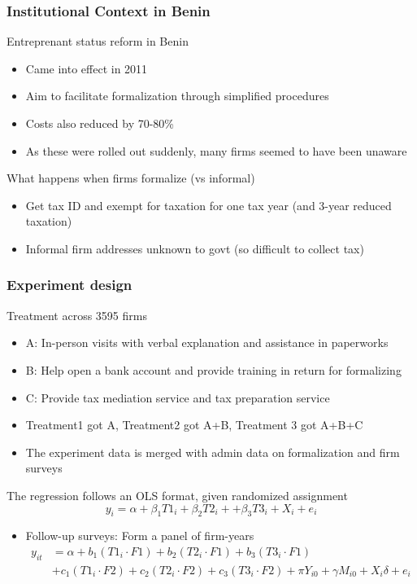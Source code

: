 \documentclass[aspectratio=169]{beamer}
\begin{document}
\begin{frame}
\frametitle{Institutional Context in Benin}
Entreprenant status reform in Benin
\begin{itemize}\setlength\itemsep{3pt}
\item Came into effect in 2011
\item Aim to facilitate formalization through simplified procedures
\item Costs also reduced by 70-80\%
\item As these were rolled out suddenly, many firms seemed to have been unaware
\end{itemize}\medskip
What happens when firms formalize (vs informal)
\begin{itemize}\setlength\itemsep{3pt}
\item Get tax ID and exempt for taxation for one tax year (and 3-year reduced taxation)
\item Informal firm addresses unknown to govt (so difficult to collect tax)
\end{itemize}
\end{frame}

\begin{frame}
\frametitle{Experiment design}
Treatment across 3595 firms
\begin{itemize}\setlength\itemsep{3pt}
\item A: In-person visits with verbal explanation and assistance in paperworks
\item B: Help open a bank account and provide training in return for formalizing
\item C: Provide tax mediation service and tax preparation service
\item Treatment1 got A, Treatment2 got A+B, Treatment 3 got A+B+C 
\item The experiment data is merged with admin data on formalization and firm surveys
\end{itemize}\medskip
The regression follows an OLS format, given randomized assignment
\[
y_i=\alpha + \beta_1 T1_i+ \beta_2 T2_i ++\beta_3 T3_i +X_i +e_i
\]\vspace{-20pt}
\begin{itemize}\setlength\itemsep{3pt}
\item Follow-up surveys: Form a panel of firm-years
\[
\begin{aligned}
y_{it}&=\alpha + b_1 (T1_i\cdot F1)+ b_2 (T2_i\cdot F1)+b_3 (T3_i\cdot F1)\\
&+ c_1 (T1_i\cdot F2)+ c_2 (T2_i\cdot F2)+c_3 (T3_i\cdot F2)+\pi Y_{i0} + \gamma M_{i0} +X_i\delta +e_i
\end{aligned}
\]
\end{itemize}
\end{frame}
\end{document}
